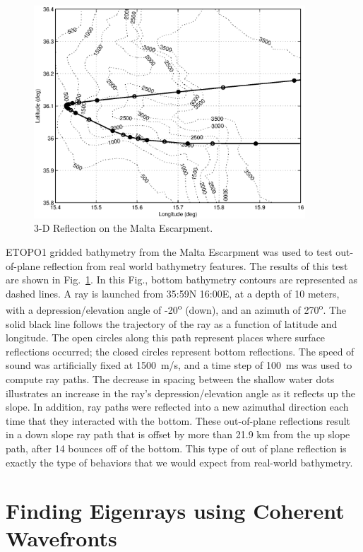 \documentclass{ws-jca}
\begin{document}
\begin{figure}[th]
	\centerline{\includegraphics[width=4in]{reflect_grid_malta.eps}} 
	\vspace*{8pt}
	\caption{3-D Reflection on the Malta Escarpment.
	\label{fig:reflect_grid_malta}}
\end{figure}

ETOPO1 gridded bathymetry\cite{ETOPO1} from the Malta Escarpment was used
to test out-of-plane reflection from real world bathymetry features. The
results of this test are shown in Fig.~\ref{fig:reflect_grid_malta}. In
this Fig., bottom bathymetry contours are represented as dashed lines. A
ray is launched from 35:59N 16:00E, at a depth of 10 meters, with a
depression/elevation angle of -20\textsuperscript{o} (down), and an azimuth
of 270\textsuperscript{o}. The solid black line follows the trajectory of
the ray as a function of latitude and longitude. The open circles along
this path represent places where surface reflections occurred; the closed
circles represent bottom reflections. The speed of sound was artificially
fixed at 1500~m/s, and a time step of 100~ms was used to compute ray paths.
The decrease in spacing between the shallow water dots illustrates an
increase in the ray's depression/elevation angle as it reflects up the slope. In addition,
ray paths were reflected into a new azimuthal direction each time that they
interacted with the bottom. These out-of-plane reflections result in a down
slope ray path that is offset by more than 21.9 km from the up slope path,
after 14 bounces off of the bottom. This type of out of plane reflection is
exactly the type of behaviors that we would expect from real-world
bathymetry.\cite{Sturm2008}

\section{Finding Eigenrays using Coherent Wavefronts}
\end{document}
